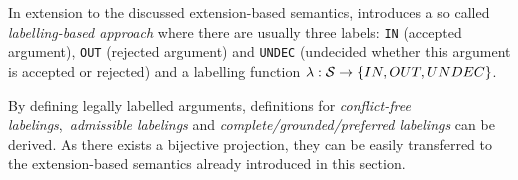 In extension to the discussed extension-based semantics, \cite{liao} introduces a so called \textit{labelling-based approach} where there are usually three labels: \texttt{IN} (accepted argument), \texttt{OUT} (rejected argument) and \texttt{UNDEC} (undecided whether this argument is accepted or rejected) and a labelling function $\lambda: \S \rightarrow \{IN, OUT, UNDEC\}$.

By defining legally labelled arguments, definitions for \textit{conflict-free labelings},~\textit{admissible labelings} and \textit{complete/grounded/preferred labelings} can be derived. As there exists a bijective projection, they can be easily transferred to the extension-based semantics already introduced in this section.

